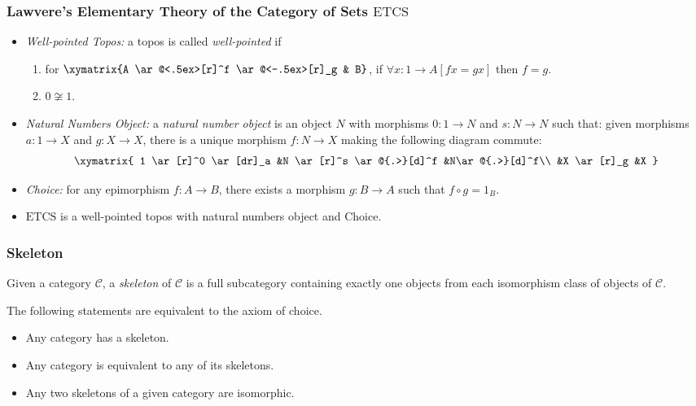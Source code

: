 \documentclass[UTF8,aspectratio=43,11pt,colorlinks,compress,openany]{beamer}%
\begin{document}
\begin{frame}\frametitle{Lawvere's Elementary Theory of the Category of Sets $\mathrm{ETCS}$}
\setlength\abovedisplayskip{0pt}
\setlength\belowdisplayskip{0pt}
\begin{itemize}
	\item \emph{Well-pointed Topos:} a topos is called \emph{well-pointed} if
	\begin{enumerate}
		\item for $\xymatrix{A \ar@<.5ex>[r]^f \ar@<-.5ex>[r]_g & B}$, if $\forall x: 1\to A[fx=gx]$ then $f=g$.
		\item $0\not\cong 1$.
	\end{enumerate}
	\item \emph{Natural Numbers Object:} a \emph{natural number object} is an object $N$ with morphisms $0: 1\to N$ and $s: N \to N$ such that: given morphisms $a: 1\to X$ and $g: X \to X$, there is a unique morphism $f: N \to X$ making the following diagram commute:
\[
\xymatrix{
1 \ar[r]^0 \ar[dr]_a &N \ar[r]^s \ar@{.>}[d]^f &N\ar@{.>}[d]^f\\
 &X \ar[r]_g &X
}
\]
	\item \emph{Choice:} for any epimorphism $f: A\to B$, there exists a morphism $g: B\to A$ such that $f\circ g=1_B$.\item $\mathrm{ETCS}$ is a well-pointed topos with natural numbers object and Choice.
\end{itemize}
\end{frame}

\begin{frame}\frametitle{Skeleton}
\begin{definition}[Skeleton]
	Given a category $\mathcal{C}$, a \emph{skeleton} of $\mathcal{C}$ is a full subcategory containing exactly one objects from each isomorphism class of objects of $\mathcal{C}$.
\end{definition}
\begin{block}{The following statements are equivalent to the axiom of choice.}
\begin{itemize}
	\item Any category has a skeleton.
	\item Any category is equivalent to any of its skeletons.
	\item Any two skeletons of a given category are isomorphic.
\end{itemize}	
\end{block}
\end{frame}
\end{document}
